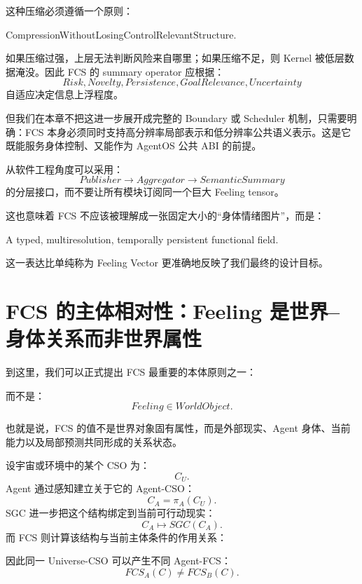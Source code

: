 这种压缩必须遵循一个原则：
\begin{statementbox}
CompressionWithoutLosingControlRelevantStructure.
\end{statementbox}
如果压缩过强，上层无法判断风险来自哪里；如果压缩不足，则 Kernel 被低层数据淹没。因此 FCS 的 summary operator 应根据：
\[
Risk,
Novelty,
Persistence,
GoalRelevance,
Uncertainty
\]
自适应决定信息上浮程度。

但我们在本章不把这进一步展开成完整的 Boundary 或 Scheduler 机制，只需要明确：FCS 本身必须同时支持高分辨率局部表示和低分辨率公共语义表示。这是它既能服务身体控制、又能作为 AgentOS 公共 ABI 的前提。

从软件工程角度可以采用：
\[
Publisher
\rightarrow
Aggregator
\rightarrow
SemanticSummary
\]
的分层接口，而不要让所有模块订阅同一个巨大 Feeling tensor。

这也意味着 FCS 不应该被理解成一张固定大小的“身体情绪图片”，而是：
\begin{statementbox}
A typed, multiresolution, temporally persistent functional field.
\end{statementbox}
这一表达比单纯称为 Feeling Vector 更准确地反映了我们最终的设计目标。

\section{FCS 的主体相对性：Feeling 是世界--身体关系而非世界属性}

到这里，我们可以正式提出 FCS 最重要的本体原则之一：
\begin{statementbox}
\centering
{}
\end{statementbox}
而不是：
\[
Feeling
\in
WorldObject.
\]

也就是说，FCS 的值不是世界对象固有属性，而是外部现实、Agent 身体、当前能力以及局部预测共同形成的关系状态。

设宇宙或环境中的某个 CSO 为：
\[
C_U.
\]
Agent 通过感知建立关于它的 Agent-CSO：
\[
C_A=\pi_A(C_U).
\]
SGC 进一步把这个结构绑定到当前可行动现实：
\[
C_A
\mapsto
SGC(C_A).
\]
而 FCS 则计算该结构与当前主体条件的作用关系：
\begin{statementbox}
\centering
{}
\end{statementbox}

因此同一 Universe-CSO 可以产生不同 Agent-FCS：
\[
FCS_A(C)
\neq
FCS_B(C).
\]

